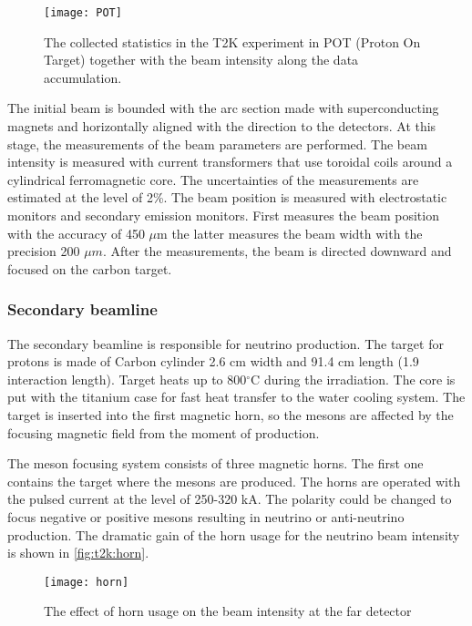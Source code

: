 \documentclass[../main.tex]{subfiles}
\begin{document}
\begin{figure}[!ht]
  \centering
  \texttt{[image: POT]}
  \caption{The collected statistics in the T2K experiment in POT (Proton On Target) together with the beam intensity along the data accumulation.}
  \label{fig:t2k:POT}
\end{figure}

The initial beam is bounded with the arc section made with superconducting magnets and horizontally aligned with the direction to the detectors. At this stage, the measurements of the beam parameters are performed. The beam intensity is measured with current transformers that use toroidal coils around a cylindrical ferromagnetic core. The uncertainties of the measurements are estimated at the level of 2\%. The beam position is measured with electrostatic monitors and secondary emission monitors. First measures the beam position with the accuracy of 450 $\mu \text{m}$ the latter measures the beam width with the precision 200 $\mu m$. After the measurements, the beam is directed downward and focused on the carbon target.

\subsubsection{Secondary beamline}
The secondary beamline is responsible for neutrino production. The target for protons is made of Carbon cylinder 2.6 cm width and 91.4 cm length (1.9 interaction length). Target heats up to 800$^\circ$C during the irradiation. The core is put with the titanium case for fast heat transfer to the water cooling system. The target is inserted into the first magnetic horn, so the mesons are affected by the focusing magnetic field from the moment of production.

The meson focusing system consists of three magnetic horns. The first one contains the target where the mesons are produced. The horns are operated with the pulsed current at the level of 250-320 kA. The polarity could be changed to focus negative or positive mesons resulting in neutrino or anti-neutrino production. The dramatic gain of the horn usage for the neutrino beam intensity is shown in \autoref{fig:t2k:horn}.

\begin{figure}[!ht]
  \centering
    \texttt{[image: horn]}
    \caption{The effect of horn usage on the beam intensity at the far detector}
    \label{fig:t2k:horn}
\end{figure}
\end{document}
